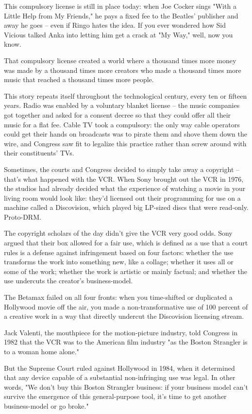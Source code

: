This compulsory license is still in place today: when Joe Cocker
sings "With a Little Help from My Friends," he pays a fixed fee to
the Beatles' publisher and away he goes -- even if Ringo hates the
idea. If you ever wondered how Sid Vicious talked Anka into letting
him get a crack at "My Way," well, now you know.

That compulsory license created a world where a thousand times more
money was made by a thousand times more creators who made a
thousand times more music that reached a thousand times more
people.

This story repeats itself throughout the technological century,
every ten or fifteen years. Radio was enabled by a voluntary
blanket license -- the music companies got together and asked for a
consent decree so that they could offer all their music for a flat
fee. Cable TV took a compulsory: the only way cable operators could
get their hands on broadcasts was to pirate them and shove them
down the wire, and Congress saw fit to legalize this practice
rather than screw around with their constituents' TVs.

Sometimes, the courts and Congress decided to simply take away a
copyright -- that's what happened with the VCR. When Sony brought
out the VCR in 1976, the studios had already decided what the
experience of watching a movie in your living room would look like:
they'd licensed out their programming for use on a machine called a
Discovision, which played big LP-sized discs that were read-only.
Proto-DRM.

The copyright scholars of the day didn't give the VCR very good
odds. Sony argued that their box allowed for a fair use, which is
defined as a use that a court rules is a defense against
infringement based on four factors: whether the use transforms the
work into something new, like a collage; whether it uses all or
some of the work; whether the work is artistic or mainly factual;
and whether the use undercuts the creator's business-model.

The Betamax failed on all four fronts: when you time-shifted or
duplicated a Hollywood movie off the air, you made a
non-transformative use of 100 percent of a creative work in a way
that directly undercut the Discovision licensing stream.

Jack Valenti, the mouthpiece for the motion-picture industry, told
Congress in 1982 that the VCR was to the American film industry "as
the Boston Strangler is to a woman home alone."

But the Supreme Court ruled against Hollywood in 1984, when it
determined that any device capable of a substantial non-infringing
use was legal. In other words, "We don't buy this Boston Strangler
business: if your business model can't survive the emergence of
this general-purpose tool, it's time to get another business-model
or go broke."

